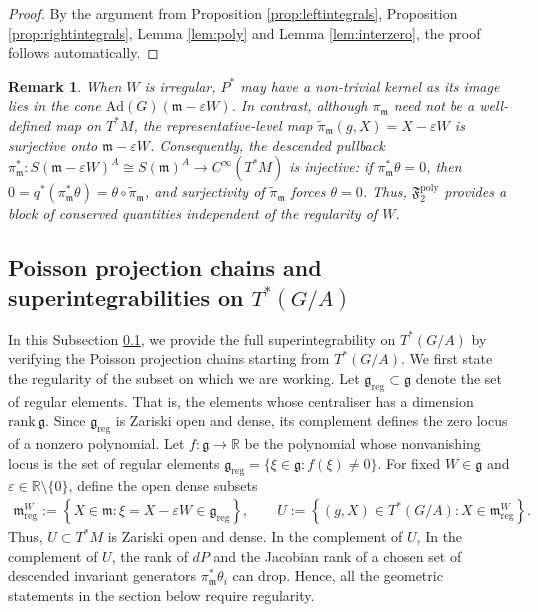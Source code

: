\documentclass[11pt]{amsart}
\theoremstyle{definition}
\theoremstyle{plain}
\newtheorem{remark}[theorem]{Remark}
\theoremstyle{conclusion}
\begin{document}
\begin{proof}
    By the argument from Proposition \ref{prop:leftintegrals}, Proposition \ref{prop:rightintegrals}, Lemma \ref{lem:poly} and Lemma \ref{lem:interzero}, the proof follows automatically. 
\end{proof}

\begin{remark} 
When $W$ is irregular, $P^*$ may have a non-trivial kernel as its image lies in the cone $\mathrm{Ad}(G)(\mathfrak{m}-\varepsilon W)$. %
In contrast, although $\pi_{\mathfrak{m}}$ need not be a well-defined map on $T^*M$, the representative-level map $\widetilde{\pi}_{\mathfrak{m}}(g,X)=X-\varepsilon W$ is surjective onto $\mathfrak{m}-\varepsilon W$. Consequently, the descended pullback $\pi_{\mathfrak{m}}^*:S(\mathfrak{m}-\varepsilon W)^A\cong S(\mathfrak{m})^A\to C^{\infty}(T^*M)$ is injective: if $\pi_{\mathfrak{m}}^*\theta=0$, then $0=q^*(\pi_{\mathfrak{m}}^*\theta)=\theta\circ\widetilde{\pi}_{\mathfrak{m}}$, and surjectivity of $\widetilde{\pi}_{\mathfrak{m}}$ forces $\theta=0$. Thus, $\mathfrak{F}_2^{\mathrm{poly}}$ provides a block of conserved quantities independent of the regularity of $W$.
\end{remark}

\subsection{Poisson projection chains and superintegrabilities on \texorpdfstring{$T^*(G/A)$}{T*(G/A)}}
\label{subsec:Poisuper}

In this Subsection \ref{subsec:Poisuper}, we provide the full superintegrability on $T^*(G/A)$ by verifying the Poisson projection chains starting from $T^*(G/A)$. We first state the regularity of the subset on which we are working. Let $\mathfrak{g}_{\mathrm{reg}} \subset \mathfrak{g}$ denote the set of regular elements. That is, the elements whose centraliser has a dimension $\mathrm{rank} \, \mathfrak{g}$. Since $\mathfrak{g}_{\mathrm{reg}}$ is Zariski open and dense, its complement defines the zero locus of a nonzero polynomial. Let $f:\mathfrak{g}\to\mathbb{R}$ be the polynomial whose nonvanishing locus is the set of regular elements $\mathfrak{g}_{\mathrm{reg}}=\{\xi\in\mathfrak{g}:f(\xi)\neq0\}$. For fixed $W \in \mathfrak{g}$ and $\varepsilon \in \mathbb{R} \setminus \{0\}$,  define the open dense subsets \begin{align}
\mathfrak{m}_{\mathrm{reg}}^W:= \left\{X\in\mathfrak{m}: \xi =  X-\varepsilon W\in \mathfrak{g}_{\mathrm{reg}}\right\},\qquad U:=  \left\{(g,X)\in T^*(G/A): X\in\mathfrak{m}_{\mathrm{reg}}^W\right\}. \label{eq:regularity}
\end{align} Thus, $U\subset T^*M$ is Zariski open and dense. In the complement of $U$, %
In the complement of $U$, the rank of $dP$ and the Jacobian rank of a chosen set of descended invariant generators $\pi_\mathfrak{m}^*\theta_i$ can drop. Hence, all the geometric statements in the section below require regularity.
\end{document}
